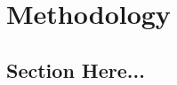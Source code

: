 %
%
\let\textcircled=\pgftextcircled
\chapter{Methodology}
\label{chap:method}
\section{Section Here...}





